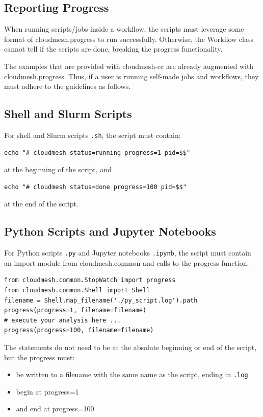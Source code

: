 \subsection{Reporting Progress}\label{reporting-progress}

When running scripts/jobs inside a workflow, the scripts must leverage
some format of cloudmesh.progress to run successfully. Otherwise, the
Workflow class cannot tell if the scripts are done, breaking the
progress functionality.

The examples that are provided with cloudmesh-cc are already augmented
with cloudmesh.progress. Thus, if a user is running self-made jobs and
workflows, they must adhere to the guidelines as follows.

\subsection{Shell and Slurm Scripts}\label{shell-and-slurm-scripts}

For shell and Slurm scripts \texttt{.sh}, the script must contain:

\begin{verbatim}
echo "# cloudmesh status=running progress=1 pid=$$"
\end{verbatim}

at the beginning of the script, and

\begin{verbatim}
echo "# cloudmesh status=done progress=100 pid=$$"
\end{verbatim}

at the end of the script.

\subsection{Python Scripts and Jupyter
Notebooks}\label{python-scripts-and-jupyter-notebooks}

For Python scripts \texttt{.py} and Jupyter notebooks \texttt{.ipynb},
the script must contain an import module from cloudmesh.common and calls
to the progress function.


\smallskip
\begin{verbatim}
from cloudmesh.common.StopWatch import progress
from cloudmesh.common.Shell import Shell
filename = Shell.map_filename('./py_script.log').path
progress(progress=1, filename=filename)
# execute your analysis here ...
progress(progress=100, filename=filename)
\end{verbatim}
\smallskip

The statements do not need to be at the absolute beginning or end of the
script, but the progress must:

\begin{itemize}
\item
  be written to a filename with the same name as the script, ending in
  \texttt{.log}
\item
  begin at progress=1
\item
  and end at progress=100
\end{itemize}
